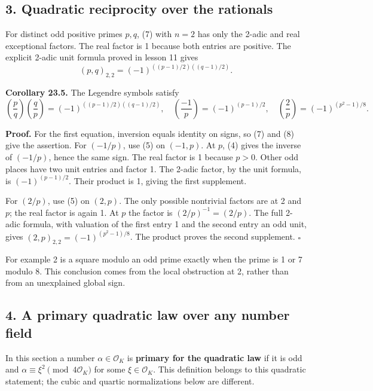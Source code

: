 \documentclass[11pt,a4paper]{article}
\begin{document}
\subsection{3. Quadratic reciprocity over the
rationals}\label{quadratic-reciprocity-over-the-rationals}

For distinct odd positive primes \(p,q\), (7) with \(n=2\) has only the
2-adic and real exceptional factors. The real factor is 1 because both
entries are positive. The explicit 2-adic unit formula proved in lesson
11 gives \[
(p,q)_{2,2}=(-1)^{((p-1)/2)((q-1)/2)}.
\tag{8}
\]

\textbf{Corollary 23.5.} The Legendre symbols satisfy \[
\left(\frac p q\right)\left(\frac q p\right)
=(-1)^{((p-1)/2)((q-1)/2)},\quad
\left(\frac{-1}p\right)=(-1)^{(p-1)/2},\quad
\left(\frac2p\right)=(-1)^{(p^2-1)/8}.
\tag{9}
\]

\textbf{Proof.} For the first equation, inversion equals identity on
signs, so (7) and (8) give the assertion. For \((-1/p)\), use (5) on
\((-1,p)\). At \(p\), (4) gives the inverse of \((-1/p)\), hence the
same sign. The real factor is 1 because \(p>0\). Other odd places have
two unit entries and factor 1. The 2-adic factor, by the unit formula,
is \((-1)^{(p-1)/2}\). Their product is 1, giving the first supplement.

For \((2/p)\), use (5) on \((2,p)\). The only possible nontrivial
factors are at 2 and \(p\); the real factor is again 1. At \(p\) the
factor is \((2/p)^{-1}=(2/p)\). The full 2-adic formula, with valuation
of the first entry 1 and the second entry an odd unit, gives
\((2,p)_{2,2}=(-1)^{(p^2-1)/8}\). The product proves the second
supplement. \(\square\)

For example 2 is a square modulo an odd prime exactly when the prime is
1 or 7 modulo 8. This conclusion comes from the local obstruction at 2,
rather than from an unexplained global sign.

\subsection{4. A primary quadratic law over any number
field}\label{a-primary-quadratic-law-over-any-number-field}

In this section a number \(\alpha\in\mathcal O_K\) is \textbf{primary
for the quadratic law} if it is odd and
\(\alpha\equiv\xi^2\pmod{4\mathcal O_K}\) for some
\(\xi\in\mathcal O_K\). This definition belongs to this quadratic
statement; the cubic and quartic normalizations below are different.
\end{document}
